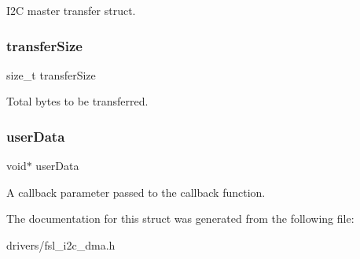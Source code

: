 I2C master transfer struct. \mbox{\label{struct__i2c__master__dma__handle_a10e6d1f095e525fa85ffe957081ed7a7}} 
\subsubsection{\texorpdfstring{transferSize}{transferSize}}
{\footnotesize\ttfamily size\+\_\+t transfer\+Size}

Total bytes to be transferred. \mbox{\label{struct__i2c__master__dma__handle_a2e294dd14122c554baa0665072b4ca7a}} 
\subsubsection{\texorpdfstring{userData}{userData}}
{\footnotesize\ttfamily void$\ast$ user\+Data}

A callback parameter passed to the callback function. 

The documentation for this struct was generated from the following file\+:\begin{DoxyCompactItemize}
\item 
drivers/fsl\+\_\+i2c\+\_\+dma.\+h\end{DoxyCompactItemize}

